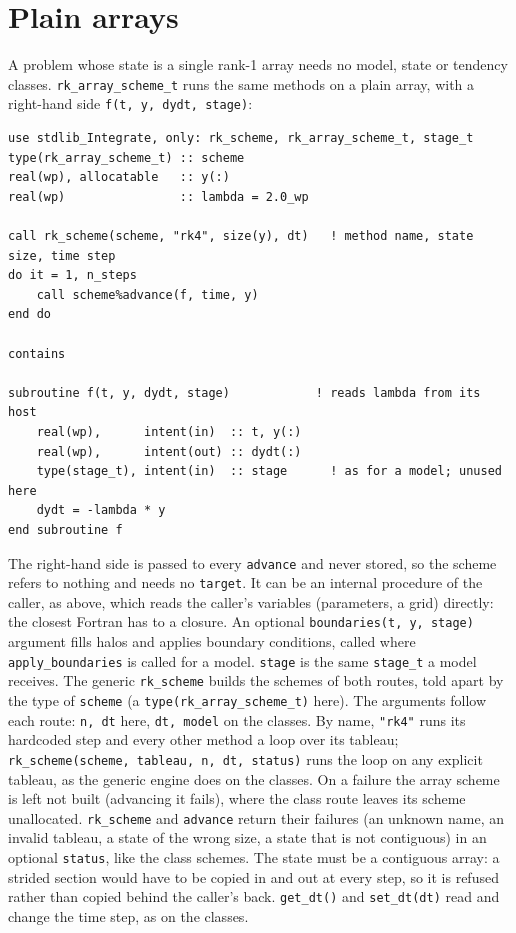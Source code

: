 \documentclass[11pt,a4paper]{article}
\newcommand{\code}[1]{\texttt{#1}}
\begin{document}
\section{Plain arrays}
\label{sec:arrays}

A problem whose state is a single rank-1 array needs no model, state or
tendency classes. \code{rk\_array\_scheme\_t} runs the same methods on a
plain array, with a right-hand side \code{f(t, y, dydt, stage)}:
\begin{lstlisting}
use stdlib_Integrate, only: rk_scheme, rk_array_scheme_t, stage_t
type(rk_array_scheme_t) :: scheme
real(wp), allocatable   :: y(:)
real(wp)                :: lambda = 2.0_wp

call rk_scheme(scheme, "rk4", size(y), dt)   ! method name, state size, time step
do it = 1, n_steps
    call scheme%advance(f, time, y)
end do

contains

subroutine f(t, y, dydt, stage)            ! reads lambda from its host
    real(wp),      intent(in)  :: t, y(:)
    real(wp),      intent(out) :: dydt(:)
    type(stage_t), intent(in)  :: stage      ! as for a model; unused here
    dydt = -lambda * y
end subroutine f
\end{lstlisting}
The right-hand side is passed to every \code{advance} and never stored, so
the scheme refers to nothing and needs no \code{target}. It can be an
internal procedure of the caller, as above, which reads the caller's
variables (parameters, a grid) directly: the closest Fortran has to a
closure. An optional \code{boundaries(t, y, stage)} argument fills halos and
applies boundary conditions, called where \code{apply\_boundaries} is called for a
model. \code{stage} is the same \code{stage\_t} a model receives.
The generic \code{rk\_scheme} builds the schemes of both routes, told apart by
the type of \code{scheme} (a \code{type(rk\_array\_scheme\_t)} here). The
arguments follow each route: \code{n, dt} here, \code{dt, model} on the
classes. By name, \code{"rk4"} runs its hardcoded step and every other method
a loop over its tableau; \code{rk\_scheme(scheme, tableau, n, dt, status)} runs
the loop on any explicit tableau, as the generic engine does on the classes.
On a failure the array scheme is left not built (advancing it fails), where
the class route leaves its scheme unallocated.
\code{rk\_scheme} and \code{advance} return their failures (an unknown name, an
invalid tableau, a state of the wrong size, a state that is not contiguous) in
an optional \code{status}, like the class schemes. The state must be a
contiguous array: a strided section would have to be copied in and out at
every step, so it is refused rather than copied behind the caller's back.
\code{get\_dt()} and \code{set\_dt(dt)} read and change the time step, as on the
classes.
\end{document}

